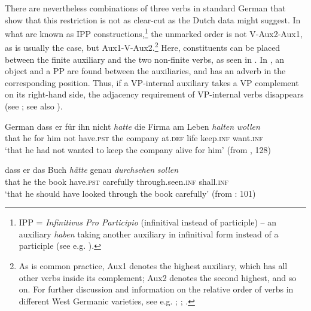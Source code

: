 \documentclass[output=paper, colorlinks, citecolor=brown]{langscibook}
\begin{document}
\z 
\z

There are nevertheless combinations of three verbs in standard German that show that this restriction is not as clear-cut as the Dutch data might suggest. In what are known as IPP constructions,\footnote{IPP = \textit{Infinitivus Pro Participio} (infinitival instead of participle) – an auxiliary \textit{haben} taking another auxiliary in infinitival form instead of a participle (see e.g. \citealt[46–48]{Wurmbrand2004}).} the unmarked order is not V-Aux2-Aux1, as is usually the case, but Aux1-V-Aux2.\footnote{As is common practice, Aux1 denotes the highest auxiliary, which has all other verbs inside its complement; Aux2 denotes the second highest, and so on. For further discussion and information on the relative order of verbs in different West Germanic varieties, see e.g. \citet{Wurmbrand2004}; \citet{Sapp2011}; \citet{Culicover2014}.} Here, constituents can be placed between the finite auxiliary and the two non-finite verbs, as seen in . In , an object and a PP are found between the auxiliaries, and  has an adverb in the corresponding position. Thus, if a VP-internal auxiliary takes a VP complement on its right-hand side, the adjacency requirement of VP-internal verbs disappears (see \citealt[97–102]{Sheehan2017Final}; see also \cites[]{Haider2003}[132–135]{Haider2013}).


\ea German
\label{ex:sangfelt:19}
\ea\label{ex:sangfelt:19a}
\gll dass er für ihn nicht \textit{hatte} {die} {Firma} am Leben \textit{halten} \textit{wollen} \\
 that he for him not have.\textsc{pst} the company at.\textsc{def} life keep.\textsc{inf} want.\textsc{inf} \\
\glt ‘that he had not wanted to keep the company alive for him’ (from \citealt{Haider2013}, 128)

\ex\label{ex:sangfelt:19b}
\gll dass er das Buch \textit{hätte} {genau} \textit{durchsehen} \textit{sollen}\\
 that he the book have.\textsc{pst} carefully through.seen.\textsc{inf} shall.\textsc{inf} \\
\glt ‘that he should have looked through the book carefully’ (from \citealt{Sheehan2017Final}: 101)
\z 
\z
\end{document}
